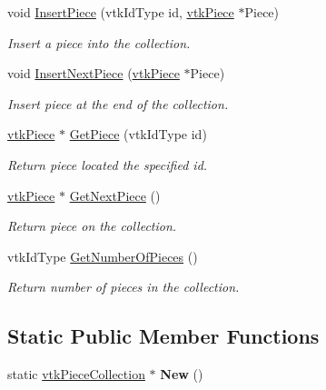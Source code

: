 \begin{DoxyCompactItemize}
\item 
void \hyperlink{classvtkPieceCollection_a8bd89cd54bd00572fbffc2c403e35cef}{InsertPiece} (vtkIdType id, \hyperlink{classvtkPiece}{vtkPiece} $\ast$Piece)
\begin{DoxyCompactList}\small\item\em Insert a piece into the collection. \item\end{DoxyCompactList}\item 
void \hyperlink{classvtkPieceCollection_a6f37b0535d1a952beaa969000f857f24}{InsertNextPiece} (\hyperlink{classvtkPiece}{vtkPiece} $\ast$Piece)
\begin{DoxyCompactList}\small\item\em Insert piece at the end of the collection. \item\end{DoxyCompactList}\item 
\hyperlink{classvtkPiece}{vtkPiece} $\ast$ \hyperlink{classvtkPieceCollection_a4e0569b11db93fd143cd2200529f41b7}{GetPiece} (vtkIdType id)
\begin{DoxyCompactList}\small\item\em Return piece located the specified id. \item\end{DoxyCompactList}\item 
\hyperlink{classvtkPiece}{vtkPiece} $\ast$ \hyperlink{classvtkPieceCollection_ae40adc69656f67b99b9e1fe07f94ad04}{GetNextPiece} ()
\begin{DoxyCompactList}\small\item\em Return piece on the collection. \item\end{DoxyCompactList}\item 
\hypertarget{classvtkPieceCollection_aa62d1a9e37a2d77f1b88d3201dc03057}{
vtkIdType \hyperlink{classvtkPieceCollection_aa62d1a9e37a2d77f1b88d3201dc03057}{GetNumberOfPieces} ()}
\label{classvtkPieceCollection_aa62d1a9e37a2d77f1b88d3201dc03057}

\begin{DoxyCompactList}\small\item\em Return number of pieces in the collection. \item\end{DoxyCompactList}\end{DoxyCompactItemize}
\subsection*{Static Public Member Functions}
\begin{DoxyCompactItemize}
\item 
\hypertarget{classvtkPieceCollection_adc852deac371a5907f2e36124d9ea4ad}{
static \hyperlink{classvtkPieceCollection}{vtkPieceCollection} $\ast$ {\bfseries New} ()}
\label{classvtkPieceCollection_adc852deac371a5907f2e36124d9ea4ad}

\end{DoxyCompactItemize}


